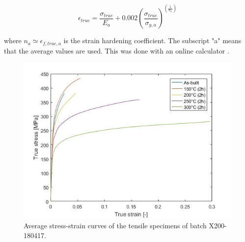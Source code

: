 $$\epsilon_{true}=\frac{\sigma_{true}}{E_a}+ 0.002(\frac{\sigma_{true}}{\sigma_{y,a}})^{(\frac{1}{n_a})}$$

where $n_a \simeq \epsilon_{f,true,a}$ is the strain hardening coefficient. The subscript "a" means that the average values are used. This was done with an online calculator \parencite{RO}. \\


\begin{figure}[ht]
\centering
\centerline{\includegraphics[scale=0.6]{Images/MeanTrac}}
\decoRule
\caption[Average stress-strain curves of the tensile specimens of batch X200-180417.]{Average stress-strain curves of the tensile specimens of batch X200-180417.}
\label{fig:MeanTrac}
\end{figure}


